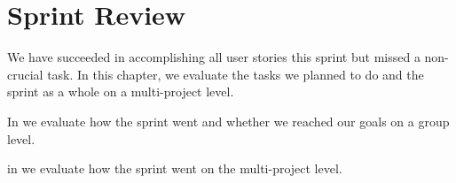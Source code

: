 \chapter{Sprint Review}\label{chap:sprint3_end}
We have succeeded in accomplishing all user stories this sprint but missed a non-crucial task. In this chapter, we evaluate the tasks we planned to do and the sprint as a whole on a multi-project level.

\begin{chapterorganization}
  \item In  we evaluate how the sprint went and whether we reached our goals on a group level.
  \item in  we evaluate how the sprint went on the multi-project level.
\end{chapterorganization}

